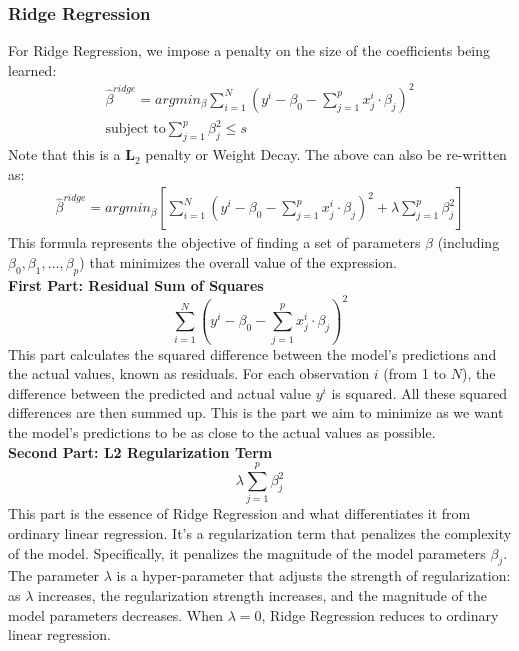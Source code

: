 \documentclass{article}
\begin{document}
\subsubsection{Ridge Regression}
For Ridge Regression, we impose a penalty on the size of the coefficients being learned:
\begin{align*}
    \hat{\beta}^{ridge} = argmin_{\beta}\sum_{i=1}^{N}\left(y^{i}-\beta_{0}-\sum_{j=1}^{p}x_{j}^{i} \cdot \beta_{j}\right)^{2}\\
    \text{subject to} \sum_{j=1}^{p}\beta_{j}^{2} \leq s
\end{align*}
Note that this is a $\bm{L}_{2}$ penalty or Weight Decay. The above can also be re-written as:
\begin{align*}
    \hat{\beta}^{ridge} = argmin_{\beta}\left[ \sum_{i=1}^{N}\left(y^{i}-\beta_{0}-\sum_{j=1}^{p}x_{j}^{i} \cdot \beta_{j}\right)^{2} + \lambda \sum_{j=1}^{p}\beta_{j}^{2}\right]
\end{align*}
This formula represents the objective of finding a set of parameters \( \beta \) (including \( \beta_0, \beta_1, \ldots, \beta_p \)) that minimizes the overall value of the expression.\\

\textbf{First Part: Residual Sum of Squares}
\[
\sum_{i=1}^{N}\left(y^{i}-\beta_{0}-\sum_{j=1}^{p}x_{j}^{i} \cdot \beta_{j}\right)^{2}
\]
This part calculates the squared difference between the model's predictions and the actual values, known as residuals. For each observation \( i \) (from 1 to \( N \)), the difference between the predicted and actual value \( y^{i} \) is squared. All these squared differences are then summed up. This is the part we aim to minimize as we want the model's predictions to be as close to the actual values as possible.\\

\textbf{Second Part: L2 Regularization Term}
\[
\lambda \sum_{j=1}^{p}\beta_{j}^{2}
\]
This part is the essence of Ridge Regression and what differentiates it from ordinary linear regression. It's a regularization term that penalizes the complexity of the model. Specifically, it penalizes the magnitude of the model parameters \( \beta_j \). The parameter \( \lambda \) is a hyper-parameter that adjusts the strength of regularization: as \( \lambda \) increases, the regularization strength increases, and the magnitude of the model parameters decreases. When \( \lambda = 0 \), Ridge Regression reduces to ordinary linear regression.\\
\end{document}
